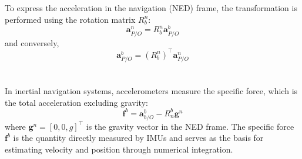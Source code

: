 \\ \\
To express the acceleration in the navigation (NED) frame, the transformation is performed using the rotation matrix $R_b^n$:  
$$
    \mathbf{a}_{P/O}^{n} = R_b^n \mathbf{a}_{P/O}^{b}
$$
and conversely,  
$$
    \mathbf{a}_{P/O}^{b} = (R_b^n)^\top \mathbf{a}_{P/O}^{n}
$$
\\ \\
In inertial navigation systems, accelerometers measure the specific force, which is the total acceleration excluding gravity:  
$$
    \mathbf{f}^b = \mathbf{a}_{b/O}^{b} - R_n^b \mathbf{g}^n
$$
where $\mathbf{g}^n = [0, 0, g]^\top$ is the gravity vector in the NED frame. The specific force $\mathbf{f}^b$ is the quantity directly measured by IMUs and serves as the basis for estimating velocity and position through numerical integration.
